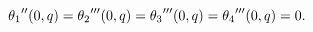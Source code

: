 \[\mathop{\theta_{1}\/}\nolimits''(0,q)=\mathop{\theta_{2}\/}\nolimits'''\!\left%
(0,q\right)=\mathop{\theta_{3}\/}\nolimits'''\!\left(0,q\right)=\mathop{\theta%
_{4}\/}\nolimits'''\!\left(0,q\right)=0.\]